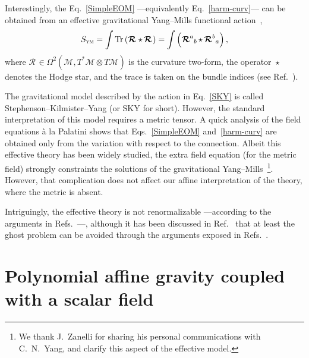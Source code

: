\documentclass[aps,prd,12pt,twocolumn,superscriptaddress,showpacs,showkeys,reprint,longbibliography]{revtex4-1}
\DeclareMathOperator{\st}{\star}
\newcommand{\Mi}{\mathcal{M}}
\newcommand{\Rif}[2]{\boldsymbol{\mathcal{R}}^{{#1}}{}_{{#2}}}
\newcommand{\Tr}{\operatorname{Tr}}
\renewcommand{\(}{\left(}
\renewcommand{\)}{\right)}
\renewcommand{\[}{\left[}
\renewcommand{\]}{\right]}
\begin{document}
Interestingly, the Eq.~\eqref{SimpleEOM} ---equivalently Eq.~\eqref{harm-curv}--- can be obtained from an effective gravitational Yang--Mills functional action~\cite{stephenson1958quadratic,kilmister1961use,Yang1974}, %
\begin{equation}
  \label{SKY}
  S_{\textsc{ym}} = \int \Tr \left( \Rif{}{} \st \Rif{}{} \right) = \int \left( \Rif{a}{b} \st \Rif{b}{a} \right),
\end{equation}
where $\Rif{}{} \in \Omega^2(\Mi, T^*\Mi \otimes T\Mi)$ is the curvature two-form, the operator $\st$ denotes the Hodge star, and the trace is taken on the bundle indices (see Ref.~\cite{bourguignon1982yang}).

The gravitational model described by the action in Eq.~\eqref{SKY} is called Stephenson--Kilmister--Yang (or SKY for short). However, the standard interpretation of this model requires a metric tensor. A quick analysis of the field equations \`a la Palatini shows that Eqs.~\eqref{SimpleEOM} and~\eqref{harm-curv} are obtained only from the variation with respect to the connection. Albeit this effective theory has been widely studied, the extra field equation (for the metric field) strongly constraints the solutions of the gravitational Yang--Mills~\footnote{We thank J.~Zanelli for sharing his personal communications with C.~N.~Yang, and clarify this aspect of the effective model.}. However, that complication does not affect our affine interpretation of the theory, where the metric is absent.

Intriguingly, the effective theory is not renormalizable ---according to the arguments in Refs.~\cite{McGady:2013sga,Camanho:2014apa}---, although it has been discussed in Ref.~\cite{Chen:2010at} that at least the ghost problem can be avoided through the arguments exposed in Refs.~\cite{Kleinert:1987eb,Bender:2007wu,Bender:2008vh,Mannheim:2009zj}.


\section{\label{matter}Polynomial affine gravity coupled with a scalar field}
\end{document}
